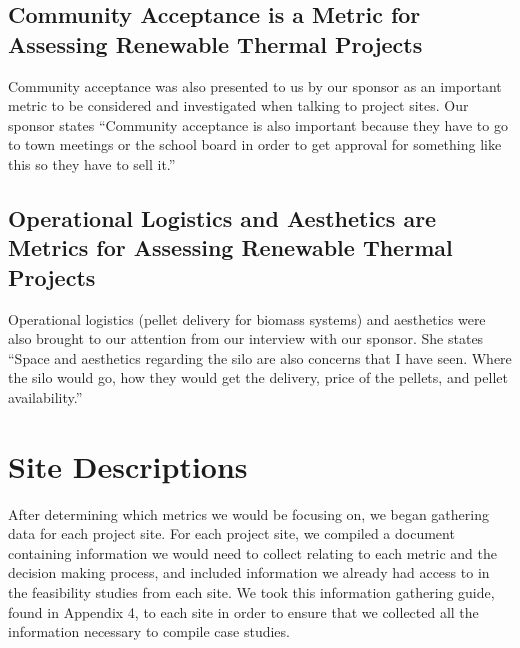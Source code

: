 \subsection{Community Acceptance is a Metric for Assessing Renewable Thermal Projects}
\par Community acceptance was also presented to us by our sponsor as an important metric to be considered and investigated when talking to project sites. Our sponsor states “Community acceptance is also important because they have to go to town meetings or the school board in order to get approval for something like this so they have to sell it.”

\subsection{Operational Logistics and Aesthetics are Metrics for Assessing Renewable Thermal Projects}
\par Operational logistics (pellet delivery for biomass systems) and aesthetics were also brought to our attention from our interview with our sponsor. She states “Space and aesthetics regarding the silo are also concerns that I have seen. Where the silo would go, how they would get the delivery, price of the pellets, and pellet availability.”

\section{Site Descriptions}
\par After determining which metrics we would be focusing on, we began gathering data for each project site. For each project site, we compiled a document containing information we would need to collect relating to each metric and the decision making process, and included information we already had access to in the feasibility studies from each site. We took this information gathering guide, found in Appendix 4, to each site in order to ensure that we collected all the information necessary to compile case studies.

